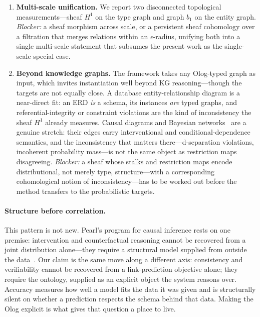 \begin{enumerate}
embedding geometry rather than be imposed only as an external attention
mask, as it is here.
\item \textbf{Multi-scale unification.} We report two disconnected
topological measurements---sheaf $H^1$ on the type graph and graph
$b_1$ on the entity graph. \emph{Blocker:} a sheaf morphism across
scale, or a persistent sheaf cohomology over a filtration that merges
relations within an $\epsilon$-radius, unifying both into a single
multi-scale statement that subsumes the present work as the
single-scale special case.
\item \textbf{Beyond knowledge graphs.} The framework takes any
Olog-typed graph as input, which invites instantiation well beyond KG
reasoning---though the targets are not equally close. A database
entity-relationship diagram is a near-direct fit: an ERD \emph{is} a
schema, its instances \emph{are} typed graphs, and referential-integrity
or constraint violations are the kind of inconsistency the sheaf $H^1$
already measures. Causal diagrams and Bayesian
networks~\cite{pearl2009causality} are a genuine stretch: their edges
carry interventional and conditional-dependence semantics, and the
inconsistency that matters there---d-separation violations, incoherent
probability mass---is not the same object as restriction maps
disagreeing. \emph{Blocker:} a sheaf whose stalks and restriction maps
encode distributional, not merely type, structure---with a corresponding
cohomological notion of inconsistency---has to be worked out before the
method transfers to the probabilistic targets.
\end{enumerate}

\paragraph{Structure before correlation.} This pattern is not new.
Pearl's program for causal inference rests on one premise: intervention
and counterfactual reasoning cannot be recovered from a joint
distribution alone---they require a structural model supplied from
outside the data~\cite{pearl2009causality}. Our claim is the same move
along a different axis: consistency and verifiability cannot be
recovered from a link-prediction objective alone; they require the
ontology, supplied as an explicit object the system reasons over.
Accuracy measures how well a model fits the data it was given and is
structurally silent on whether a prediction respects the schema behind
that data. Making the Olog explicit is what gives that question a place
to live.

